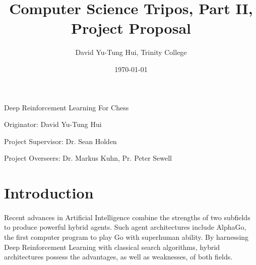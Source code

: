 \documentclass[a4paper]{article}
\title{Computer Science Tripos, Part II, Project Proposal}
\author{David Yu-Tung Hui, Trinity College}
\date{\today}
\begin{document}
\maketitle

\centerline{\huge Deep Reinforcement Learning For Chess}
\vspace{0.2in}
\centerline{\large Originator: David Yu-Tung Hui}
\vspace{0.05in}
\centerline{\large Project Supervisor: Dr. Sean Holden}
\vspace{0.05in}
\centerline{\large Project Overseers: Dr. Markus Kuhn, Pr. Peter Sewell}


\section*{Introduction}

\paragraph{}Recent advances in Artificial Intelligence combine the strengths of two subfields to produce powerful hybrid agents. Such agent architectures include AlphaGo, the first computer program to play Go with superhuman ability. \cite{AlphaGo} By harnessing Deep Reinforcement Learning with classical search algorithms, hybrid architectures possess the advantages, as well as weaknesses, of both fields.
\end{document}
